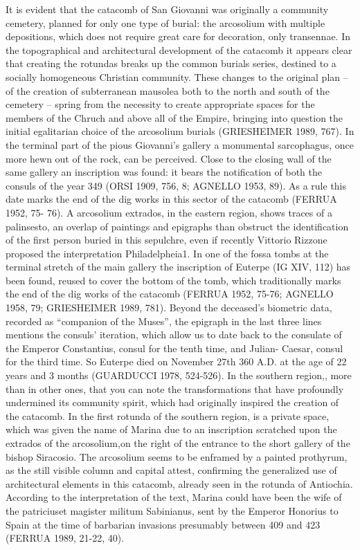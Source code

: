 \documentclass[amsthm,ebook]{saparticle}
\begin{document}
It is evident that the catacomb of San Giovanni was originally a community cemetery, planned for only one type of burial: the arcosolium with multiple depositions, which does not require great care for decoration, only transennae. In the topographical and architectural development of the catacomb it appears clear that creating the rotundas breaks up the common burials series, destined to a socially homogeneous Christian community. These changes to the original plan – of the creation of subterranean mausolea both to the north and south of the cemetery – spring from the necessity to create appropriate spaces for the members of the Chruch and above all of the Empire, bringing into question the initial egalitarian choice of the arcosolium burials (GRIESHEIMER 1989, 767). In the terminal part of the pious Giovanni’s gallery a monumental sarcophagus, once more hewn out of the rock, can be perceived. Close to the closing wall of the same gallery an inscription was found: it bears the notification of both the consuls of the year 349 (ORSI 1909, 756, 8; AGNELLO 1953, 89). As a rule this date marks the end of the dig works in this sector of the catacomb (FERRUA 1952, 75- 76). A arcosolium extrados, in the eastern region, shows traces of a palinsesto, an overlap of paintings and epigraphs than obstruct the identification of the first person buried in this sepulchre, even if recently Vittorio Rizzone proposed the interpretation Philadelpheia1. In one of the fossa tombs at the terminal stretch of the main gallery the inscription of Euterpe (IG XIV, 112) has been found, reused to cover the bottom of the tomb, which traditionally marks the end of the dig works of the catacomb (FERRUA 1952, 75-76; AGNELLO 1958, 79; GRIESHEIMER 1989, 781). Beyond the deceased’s biometric data, recorded as “companion of the Muses”, the epigraph in the last three lines mentions the consuls’ iteration, which allow us to date back to the consulate of the Emperor Constantius, consul for the tenth time, and Julian- Caesar, consul for the third time. So Euterpe died on November 27th 360 A.D. at the age of 22 years and 3 months (GUARDUCCI 1978, 524-526).
In the southern region,, more than in other ones, that you can note the transformations that have profoundly undermined its community spirit, which had originally inspired the creation of the catacomb. In the first rotunda of the southern region, is a private space, which was given the name of Marina due to an inscription scratched upon the extrados of the arcosolium,on the right of the entrance to the short gallery of the bishop Siracosio. The arcosolium seems to be enframed by a painted prothyrum, as the still visible column and capital attest, confirming the generalized use of architectural elements in this catacomb, already seen in the rotunda of Antiochia. According to the interpretation of the text, Marina could have been the wife of the patriciuset magister militum Sabinianus, sent by the Emperor Honorius to Spain at the time of barbarian invasions presumably between 409 and 423 (FERRUA 1989, 21-22, 40).
\end{document}
